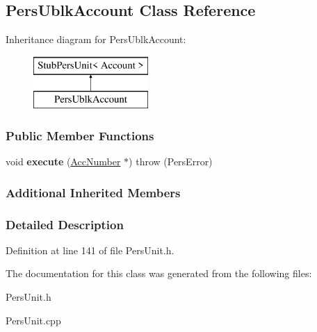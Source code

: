 \hypertarget{classPersUblkAccount}{\subsection{Pers\-Ublk\-Account Class Reference}
\label{d6/d3f/classPersUblkAccount}
}
Inheritance diagram for Pers\-Ublk\-Account\-:\begin{figure}[H]
\begin{center}
\leavevmode
\includegraphics[height=2.000000cm]{d6/d3f/classPersUblkAccount}
\end{center}
\end{figure}
\subsubsection*{Public Member Functions}
\begin{DoxyCompactItemize}
\item 
\hypertarget{classPersUblkAccount_a54c2da815d702cdb200c88cd802f7dd2}{void {\bfseries execute} (\hyperlink{classAccNumber}{Acc\-Number} $\ast$)  throw (\-Pers\-Error)}\label{d6/d3f/classPersUblkAccount_a54c2da815d702cdb200c88cd802f7dd2}

\end{DoxyCompactItemize}
\subsubsection*{Additional Inherited Members}


\subsubsection{Detailed Description}


Definition at line 141 of file Pers\-Unit.\-h.



The documentation for this class was generated from the following files\-:\begin{DoxyCompactItemize}
\item 
Pers\-Unit.\-h\item 
Pers\-Unit.\-cpp\end{DoxyCompactItemize}
